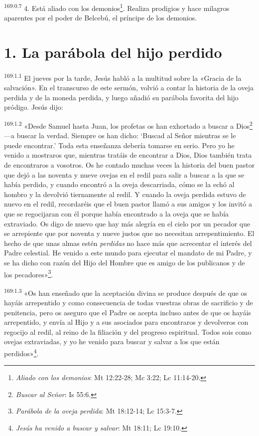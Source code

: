 \par
\textsuperscript{169:0.7} 4. Está aliado con los demonios\footnote{\textit{Aliado con los demonios}: Mt 12:22-28; Mc 3:22; Lc 11:14-20.}. Realiza prodigios y hace milagros aparentes por el poder de Belcebú, el príncipe de los demonios.

\section*{1. La parábola del hijo perdido}
\par
\textsuperscript{169:1.1} El jueves por la tarde, Jesús habló a la multitud sobre la «Gracia de la salvación». En el transcurso de este sermón, volvió a contar la historia de la oveja perdida y de la moneda perdida, y luego añadió su parábola favorita del hijo pródigo. Jesús dijo:

\par
\textsuperscript{169:1.2} «Desde Samuel hasta Juan, los profetas os han exhortado a buscar a Dios\footnote{\textit{Buscar al Señor}: Is 55:6.} ---a buscar la verdad. Siempre os han dicho: `Buscad al Señor mientras se le puede encontrar.' Toda esta enseñanza debería tomarse en serio. Pero yo he venido a mostraros que, mientras tratáis de encontrar a Dios, Dios también trata de encontraros a vosotros. Os he contado muchas veces la historia del buen pastor que dejó a las noventa y nueve ovejas en el redil para salir a buscar a la que se había perdido, y cuando encontró a la oveja descarriada, cómo se la echó al hombro y la devolvió tiernamente al redil. Y cuando la oveja perdida estuvo de nuevo en el redil, recordaréis que el buen pastor llamó a sus amigos y los invitó a que se regocijaran con él porque había encontrado a la oveja que se había extraviado. Os digo de nuevo que hay más alegría en el cielo por un pecador que se arrepiente que por noventa y nueve justos que no necesitan arrepentimiento. El hecho de que unas almas estén \textit{perdidas} no hace más que acrecentar el interés del Padre celestial. He venido a este mundo para ejecutar el mandato de mi Padre, y se ha dicho con razón del Hijo del Hombre que es amigo de los publicanos y de los pecadores»\footnote{\textit{Parábola de la oveja perdida}: Mt 18:12-14; Lc 15:3-7.}.

\par
\textsuperscript{169:1.3} «Os han enseñado que la aceptación divina se produce después de que os hayáis arrepentido y como consecuencia de todas vuestras obras de sacrificio y de penitencia, pero os aseguro que el Padre os acepta incluso antes de que os hayáis arrepentido, y envía al Hijo y a sus asociados para encontraros y devolveros con regocijo al redil, al reino de la filiación y del progreso espiritual. Todos sois como ovejas extraviadas, y yo he venido para buscar y salvar a los que están perdidos»\footnote{\textit{Jesús ha venido a buscar y salvar}: Mt 18:11; Lc 19:10.}.

